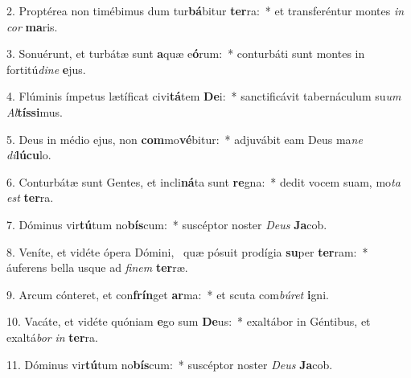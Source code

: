 2. Proptérea non timébimus dum tur\textbf{bá}bitur \textbf{ter}ra:~*  et transferéntur montes \textit{in} \textit{cor} \textbf{ma}ris.\

3. Sonuérunt, et turbátæ sunt \textbf{a}quæ e\textbf{ó}rum:~*  conturbáti sunt montes in fortitú\textit{di}\textit{ne} \textbf{e}jus.\

4. Flúminis ímpetus lætíficat civi\textbf{tá}tem \textbf{De}i:~*  sanctificávit tabernáculum su\textit{um} \textit{Al}\textbf{tís}\textbf{si}mus.\

5. Deus in médio ejus, non \textbf{com}mo\textbf{vé}bitur:~*  adjuvábit eam Deus ma\textit{ne} \textit{di}\textbf{lú}\textbf{cu}lo.\

6. Conturbátæ sunt Gentes, et incli\textbf{ná}ta sunt \textbf{re}gna:~*  dedit vocem suam, mo\textit{ta} \textit{est} \textbf{ter}ra.\

7. Dóminus vir\textbf{tú}tum no\textbf{bís}cum:~*  suscéptor noster \textit{De}\textit{us} \textbf{Ja}cob.\

8. Veníte, et vidéte ópera Dómini, \dag\  quæ pósuit prodígia \textbf{su}per \textbf{ter}ram:~*  áuferens bella usque ad \textit{fi}\textit{nem} \textbf{ter}ræ.\

9. Arcum cónteret, et con\textbf{frín}get \textbf{ar}ma:~*  et scuta com\textit{bú}\textit{ret} \textbf{i}gni.\

10. Vacáte, et vidéte quóniam \textbf{e}go sum \textbf{De}us:~*  exaltábor in Géntibus, et exaltá\textit{bor} \textit{in} \textbf{ter}ra.\

11. Dóminus vir\textbf{tú}tum no\textbf{bís}cum:~*  suscéptor noster \textit{De}\textit{us} \textbf{Ja}cob.\

